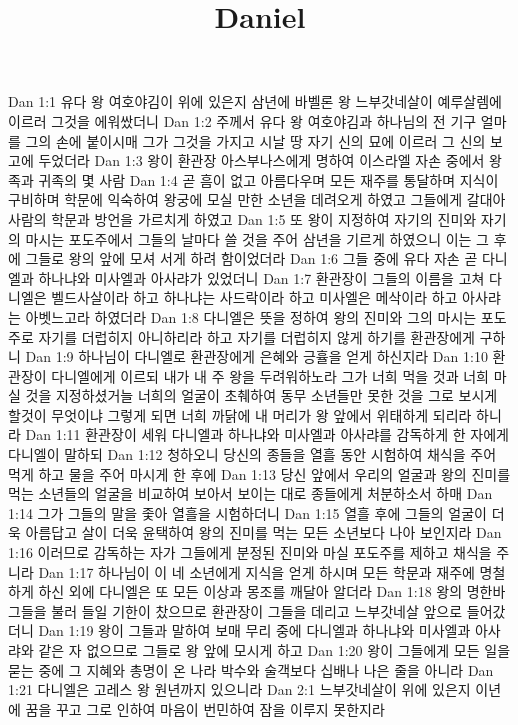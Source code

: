 

\title{Daniel}

Dan 1:1  유다 왕 여호야김이 위에 있은지 삼년에 바벨론 왕 느부갓네살이 예루살렘에 이르러 그것을 에워쌌더니
Dan 1:2  주께서 유다 왕 여호야김과 하나님의 전 기구 얼마를 그의 손에 붙이시매 그가 그것을 가지고 시날 땅 자기 신의 묘에 이르러 그 신의 보고에 두었더라
Dan 1:3  왕이 환관장 아스부나스에게 명하여 이스라엘 자손 중에서 왕족과 귀족의 몇 사람
Dan 1:4  곧 흠이 없고 아름다우며 모든 재주를 통달하며 지식이 구비하며 학문에 익숙하여 왕궁에 모실 만한 소년을 데려오게 하였고 그들에게 갈대아 사람의 학문과 방언을 가르치게 하였고
Dan 1:5  또 왕이 지정하여 자기의 진미와 자기의 마시는 포도주에서 그들의 날마다 쓸 것을 주어 삼년을 기르게 하였으니 이는 그 후에 그들로 왕의 앞에 모셔 서게 하려 함이었더라
Dan 1:6  그들 중에 유다 자손 곧 다니엘과 하나냐와 미사엘과 아사랴가 있었더니
Dan 1:7  환관장이 그들의 이름을 고쳐 다니엘은 벨드사살이라 하고 하나냐는 사드락이라 하고 미사엘은 메삭이라 하고 아사랴는 아벳느고라 하였더라
Dan 1:8  다니엘은 뜻을 정하여 왕의 진미와 그의 마시는 포도주로 자기를 더럽히지 아니하리라 하고 자기를 더럽히지 않게 하기를 환관장에게 구하니
Dan 1:9  하나님이 다니엘로 환관장에게 은혜와 긍휼을 얻게 하신지라
Dan 1:10  환관장이 다니엘에게 이르되 내가 내 주 왕을 두려워하노라 그가 너희 먹을 것과 너희 마실 것을 지정하셨거늘 너희의 얼굴이 초췌하여 동무 소년들만 못한 것을 그로 보시게 할것이 무엇이냐 그렇게 되면 너희 까닭에 내 머리가 왕 앞에서 위태하게 되리라 하니라
Dan 1:11  환관장이 세워 다니엘과 하나냐와 미사엘과 아사랴를 감독하게 한 자에게 다니엘이 말하되
Dan 1:12  청하오니 당신의 종들을 열흘 동안 시험하여 채식을 주어 먹게 하고 물을 주어 마시게 한 후에
Dan 1:13  당신 앞에서 우리의 얼굴과 왕의 진미를 먹는 소년들의 얼굴을 비교하여 보아서 보이는 대로 종들에게 처분하소서 하매
Dan 1:14  그가 그들의 말을 좇아 열흘을 시험하더니
Dan 1:15  열흘 후에 그들의 얼굴이 더욱 아름답고 살이 더욱 윤택하여 왕의 진미를 먹는 모든 소년보다 나아 보인지라
Dan 1:16  이러므로 감독하는 자가 그들에게 분정된 진미와 마실 포도주를 제하고 채식을 주니라
Dan 1:17  하나님이 이 네 소년에게 지식을 얻게 하시며 모든 학문과 재주에 명철하게 하신 외에 다니엘은 또 모든 이상과 몽조를 깨달아 알더라
Dan 1:18  왕의 명한바 그들을 불러 들일 기한이 찼으므로 환관장이 그들을 데리고 느부갓네살 앞으로 들어갔더니
Dan 1:19  왕이 그들과 말하여 보매 무리 중에 다니엘과 하나냐와 미사엘과 아사랴와 같은 자 없으므로 그들로 왕 앞에 모시게 하고
Dan 1:20  왕이 그들에게 모든 일을 묻는 중에 그 지혜와 총명이 온 나라 박수와 술객보다 십배나 나은 줄을 아니라
Dan 1:21  다니엘은 고레스 왕 원년까지 있으니라
Dan 2:1  느부갓네살이 위에 있은지 이년에 꿈을 꾸고 그로 인하여 마음이 번민하여 잠을 이루지 못한지라
